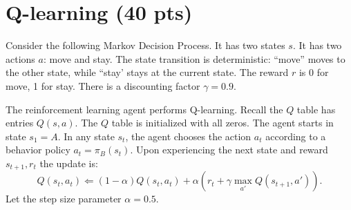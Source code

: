 \documentclass[a4paper]{article}
\theoremstyle{definition}
\begin{document}
\section{Q-learning (40 pts)}
Consider the following Markov Decision Process.
It has two states $s$.
It has two actions $a$: move and stay.
The state transition is deterministic: ``move'' moves to the other state, while ``stay' stays at the current state.
The reward $r$ is 0 for move,  1 for stay. 
There is a discounting factor $\gamma=0.9$.
\\

The reinforcement learning agent performs Q-learning.  Recall the $Q$ table has entries $Q(s,a)$.
The $Q$ table is initialized with all zeros.
The agent starts in state $s_1=A$.
In any state $s_t$, the agent chooses the action $a_t$ according to a behavior policy $a_t = \pi_B(s_t)$.
Upon experiencing the next state and reward $s_{t+1}, r_t$ the update is:
$$Q(s_t, a_t) \Leftarrow (1-\alpha) Q(s_t, a_t) + \alpha \left( r_t + \gamma \max_{a'} Q(s_{t+1}, a') \right).$$
Let the step size parameter $\alpha=0.5$.
\end{document}

